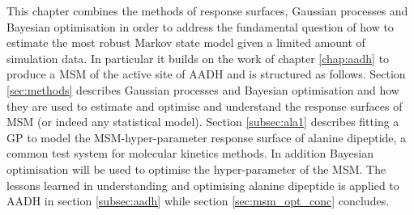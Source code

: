 This chapter combines the methods of response surfaces, Gaussian processes and Bayesian optimisation in order to address the fundamental question of how to estimate the most robust Markov state model given a limited amount of simulation data. In particular it builds on the work of chapter \ref{chap:aadh} to produce a MSM of the active site of AADH and is structured as follows. Section \ref{sec:methods} describes Gaussian processes  and Bayesian optimisation  and how they are used to estimate and optimise and understand the response surfaces of MSM (or indeed any statistical model). Section \ref{subsec:ala1} describes fitting a GP to model the MSM-hyper-parameter response surface of alanine dipeptide, a common test system for  molecular kinetics methods. In addition Bayesian optimisation will be used to optimise the hyper-parameter of the MSM.  The lessons learned in understanding and optimising  alanine dipeptide is applied to AADH in section \ref{subsec:aadh} while section \ref{sec:msm_opt_conc} concludes. 





